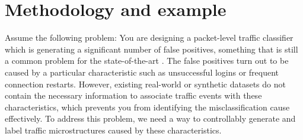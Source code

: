 \documentclass[runningheads]{llncs}
\begin{document}



\section{Methodology and example}\label{Sec:Motivation}






Assume the following problem: You are designing a packet-level traffic classifier which is generating a significant number of false positives, something that is still a common problem for the state-of-the-art \cite{nisioti2018intrusion}. The false positives turn out to be caused by a particular characteristic such as unsuccessful logins or frequent connection restarts. However, existing real-world or synthetic datasets do not contain the necessary information to associate traffic events with these characteristics, which prevents you from identifying the misclassification cause effectively. To address this problem, we need a way to controllably generate and label traffic microstructures caused by these characteristics.
\end{document}
